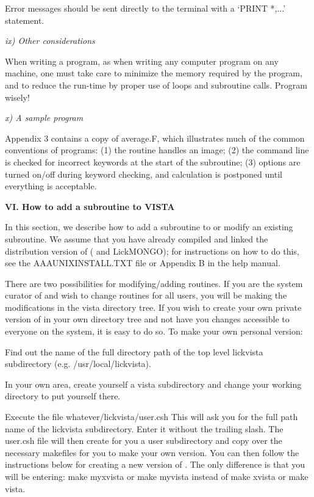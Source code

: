 	Error messages should be sent directly to the terminal
with a `PRINT *,...' statement. 

\Sskip
\centerline {\it ix) Other considerations}

	When writing a \V program, as when writing any computer
program on any machine, one must take care to minimize the memory
required by the program, and to reduce the run-time by proper use of
loops and subroutine calls. Program wisely!

\Sskip
\centerline {\it x) A sample \V program}

	Appendix 3 contains a copy of average.F, which illustrates 
much of the common conventions of \V programs:  (1) the routine handles
an image; (2) the command line is checked for incorrect 
keywords at the start of the subroutine; (3) options are turned on/off
during keyword checking, and calculation is postponed until everything 
is acceptable.

\Sskip
\centerline {\bf VI. How to add a subroutine to VISTA\rm}

\vskip 0.125in
	In this section, we describe how to add a subroutine to \V or
modify an existing subroutine. We assume that you have already compiled
and linked the distribution version of \V ( and LickMONGO); for instructions
on how to do this, see the AAAUNIXINSTALL.TXT file or Appendix B in the
help manual.

	There are two possibilities for modifying/adding routines.
If you are the system curator of \V and wish to change routines for all
users, you will be making the modifications in the vista directory tree.
If you wish to create your own private version of \V in your own
directory tree and not have you changes accessible to everyone on the
system, it is easy to do so. To make your own personal version:

\hang
{} Find out the name of the
full directory path of the
top level lickvista subdirectory (e.g. /usr/local/lickvista). 

\hang
{} In your own area, create yourself a vista
subdirectory and change your working directory to put yourself there.

\hang
{} Execute the file whatever/lickvista/user.csh
This will ask you for the full path name of the lickvista subdirectory. Enter
it without the trailing slash.  The user.csh file will then create for you
a user subdirectory and copy over the necessary makefiles for you to make
your own version.  You can then follow the instructions below for creating
a new version of \V.  The only difference is that you will be entering:
make myxvista or make myvista instead of make xvista or make vista.

